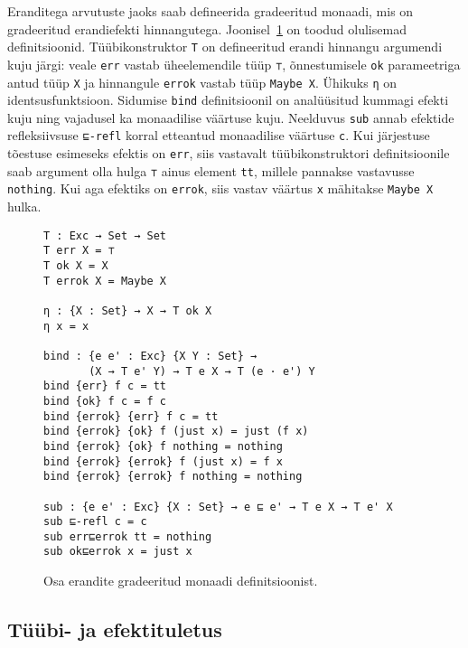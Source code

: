 \documentclass[a4paper,12pt]{article}
\begin{document}
Eranditega arvutuste jaoks saab defineerida gradeeritud monaadi, mis on gradeeritud erandiefekti hinnangutega. Joonisel~\ref{fig:exc.graded-monad} on toodud olulisemad definitsioonid.
Tüübikonstruktor {\tt T} on defineeritud erandi hinnangu argumendi kuju järgi: veale {\tt err} vastab üheelemendile tüüp {\tt ⊤}, õnnestumisele {\tt ok} parameetriga antud tüüp {\tt X} ja hinnangule {\tt errok} vastab tüüp {\tt Maybe X}.
Ühikuks {\tt η} on identsusfunktsioon.
Sidumise {\tt bind} definitsioonil on analüüsitud kummagi efekti kuju ning vajadusel ka monaadilise väärtuse kuju.
Neelduvus {\tt sub} annab efektide refleksiivsuse {\tt ⊑-refl} korral etteantud monaadilise väärtuse {\tt c}.
Kui järjestuse tõestuse esimeseks efektis on {\tt err}, siis vastavalt tüübikonstruktori definitsioonile saab argument olla hulga {\tt ⊤} ainus element {\tt tt}, millele pannakse vastavusse {\tt nothing}.
Kui aga efektiks on {\tt errok}, siis vastav väärtus {\tt x} mähitakse {\tt Maybe X} hulka.

\begin{figure}
  \begin{BVerbatim}
T : Exc → Set → Set
T err X = ⊤
T ok X = X
T errok X = Maybe X

η : {X : Set} → X → T ok X
η x = x
  
bind : {e e' : Exc} {X Y : Set} →
       (X → T e' Y) → T e X → T (e · e') Y
bind {err} f c = tt
bind {ok} f c = f c
bind {errok} {err} f c = tt
bind {errok} {ok} f (just x) = just (f x)
bind {errok} {ok} f nothing = nothing
bind {errok} {errok} f (just x) = f x
bind {errok} {errok} f nothing = nothing

sub : {e e' : Exc} {X : Set} → e ⊑ e' → T e X → T e' X
sub ⊑-refl c = c
sub err⊑errok tt = nothing
sub ok⊑errok x = just x
  \end{BVerbatim}
  \caption{Osa erandite gradeeritud monaadi definitsioonist.}
  \label{fig:exc.graded-monad}
\end{figure}

\subsection{Tüübi- ja efektituletus}\label{ssec:exc.inference}
\end{document}
